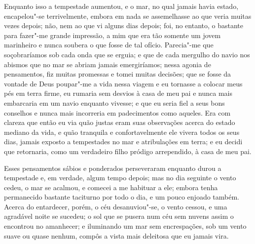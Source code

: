 Enquanto isso a tempestade aumentou, e o mar, no qual jamais havia
estado, encapelou"-se terrivelmente, embora em nada se assemelhasse ao
que veria muitas vezes depois; não, nem ao que vi alguns dias depois;
foi, no entanto, o bastante para fazer"-me grande impressão, a mim que
era tão somente um jovem marinheiro e nunca soubera o que fosse de tal
ofício. Parecia"-me que soçobraríamos sob cada onda que se erguia; e que
de cada mergulho do navio nos abismos que no mar se abriam jamais
emergiríamos; nessa agonia de pensamentos, fiz muitas promessas e tomei
muitas decisões; que se fosse da vontade de Deus poupar"-me a vida nessa
viagem e eu tornasse a colocar meus pés em terra firme, eu rumaria sem
desvios à casa de meu pai e nunca mais embarcaria em um navio enquanto
vivesse; e que eu seria fiel a seus bons conselhos e nunca mais
incorreria em padecimentos como aqueles. Era com clareza que então eu
via quão justas eram suas observações acerca do estado mediano da vida,
e quão tranquila e confortavelmente ele vivera todos os seus dias,
jamais exposto a tempestades no mar e atribulações em terra; e eu decidi
que retornaria, como um verdadeiro filho pródigo arrependido, à casa de
meu pai.

Esses pensamentos sábios e ponderados perseveraram enquanto durou a
tempestade e, em verdade, algum tempo depois; mas no dia seguinte o
vento cedeu, o mar se acalmou, e comecei a me habituar a ele; embora
tenha permanecido bastante taciturno por todo o dia, e um pouco enjoado
também. Acerca do entardecer, porém, o céu desanuviou"-se, o vento
cessou, e uma agradável noite se sucedeu; o sol que se pusera num céu
sem nuvens assim o encontrou no amanhecer; e iluminando um mar sem
encrespações, sob um vento suave ou quase nenhum, compôs a vista mais
deleitosa que eu jamais vira.

